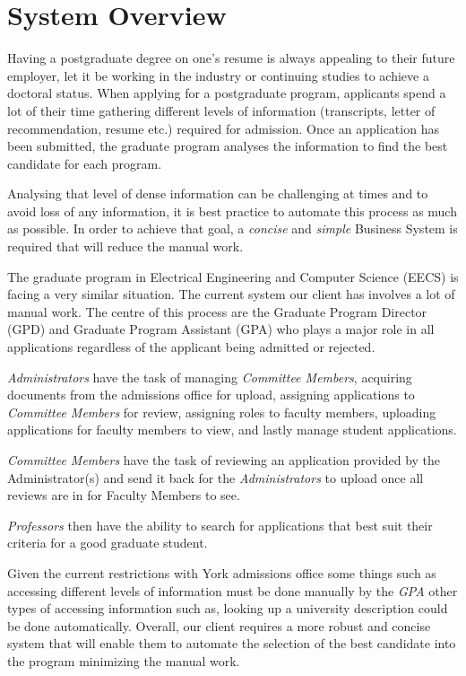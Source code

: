 \documentclass[fontsize=12pt,paper=letter,twoside]{scrartcl}
\begin{document}

\newpage
\section{System Overview}

Having a postgraduate degree on one's resume is always appealing to their future employer, let it be working in the industry or continuing studies to achieve a doctoral status. When applying for a postgraduate program, applicants spend a lot of their time gathering different levels of information (transcripts, letter of recommendation, resume etc.) required for admission. Once an application has been submitted, the graduate program analyses the information to find the best candidate for each program.

\smallskip
Analysing that level of dense information can be challenging at times and to avoid loss of any information, it is best practice to automate this process as much as possible. In order to achieve that goal, a \emph{concise} and \emph{simple} Business System is required that will reduce the manual work.

\smallskip
The graduate program in Electrical Engineering and Computer Science (EECS) is facing a very similar situation. The current system our client has involves a lot of manual work. The centre of this process are the Graduate Program Director (GPD) and Graduate Program Assistant (GPA) who plays a major role in all applications regardless of the applicant being admitted or rejected.

\smallskip
\emph{Administrators} have the task of managing \emph{Committee Members}, acquiring documents from the admissions office for upload, assigning applications to \emph{Committee Members} for review, assigning roles to faculty members, uploading applications for faculty members to view, and lastly manage student applications.

\smallskip
\emph{Committee Members} have the task of reviewing an application provided by the Administrator(s) and send it back for the \emph{Administrators} to upload once all reviews are in for Faculty Members to see.

\smallskip
\emph{Professors} then have the ability to search for applications that best suit their criteria for a good graduate student.

\smallskip
Given the current restrictions with York admissions office some things such as accessing different levels of information must be done manually by the \emph{GPA} other types of accessing information such as, looking up a university description could be done automatically. Overall, our client requires a more robust and concise system that will enable them to automate the selection of the best candidate into the program minimizing the manual work.
\end{document}
